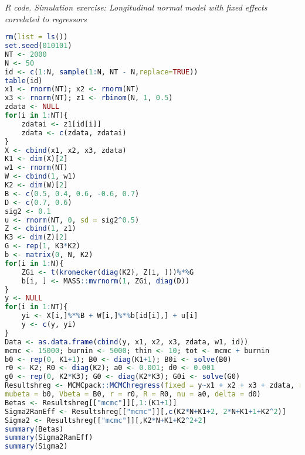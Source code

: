\begin{enumerate}[leftmargin=*]
\begin{tcolorbox}[enhanced,width=4.67in,center upper,
	fontupper=\large\bfseries,drop shadow southwest,sharp corners]
	\textit{R code. Simulation exercise: Longitudinal normal model with fixed effects correlated to regressors}
	\begin{VF}
		\begin{lstlisting}[language=R]
rm(list = ls())
set.seed(010101)
NT <- 2000
N <- 50
id <- c(1:N, sample(1:N, NT - N,replace=TRUE))
table(id)
x1 <- rnorm(NT); x2 <- rnorm(NT)
x3 <- rnorm(NT); z1 <- rbinom(N, 1, 0.5)
zdata <- NULL
for(i in 1:NT){
	zdatai <- z1[id[i]]
	zdata <- c(zdata, zdatai)
}
X <- cbind(x1, x2, x3, zdata)
K1 <- dim(X)[2]
w1 <- rnorm(NT) 
W <- cbind(1, w1)
K2 <- dim(W)[2]
B <- c(0.5, 0.4, 0.6, -0.6, 0.7)
D <- c(0.7, 0.6)
sig2 <- 0.1
u <- rnorm(NT, 0, sd = sig2^0.5)
Z <- cbind(1, z1)
K3 <- dim(Z)[2]
G <- rep(1, K3*K2)
b <- matrix(0, N, K2)
for(i in 1:N){
	ZGi <- t(kronecker(diag(K2), Z[i, ]))%*%G
	b[i, ] <- MASS::mvrnorm(1, ZGi, diag(D))
}
y <- NULL
for(i in 1:NT){
	yi <- X[i,]%*%B + W[i,]%*%b[id[i],] + u[i] 
	y <- c(y, yi)
}
Data <- as.data.frame(cbind(y, x1, x2, x3, zdata, w1, id))
mcmc <- 15000; burnin <- 5000; thin <- 10; tot <- mcmc + burnin
b0 <- rep(0, K1+1); B0 <- diag(K1+1); B0i <- solve(B0) 
r0 <- K2; R0 <- diag(K2); a0 <- 0.001; d0 <- 0.001
g0 <- rep(0, K2*K3); G0 <- diag(K2*K3); G0i <- solve(G0)
Resultshreg <- MCMCpack::MCMChregress(fixed = y~x1 + x2 + x3 + zdata, random = ~w1, group="id", data = Data, burnin = burnin, mcmc = mcmc, thin = thin, 
mubeta = b0, Vbeta = B0, r = r0, R = R0, nu = a0, delta = d0)
Betas <- Resultshreg[["mcmc"]][,1:(K1+1)]
Sigma2RanEff <- Resultshreg[["mcmc"]][,c(K2*N+K1+2, 2*N+K1+1+K2^2)]
Sigma2 <- Resultshreg[["mcmc"]][,K2*N+K1+K2^2+2]
summary(Betas)
summary(Sigma2RanEff)
summary(Sigma2)
\end{lstlisting}
	\end{VF}
\end{tcolorbox}



\end{enumerate}
